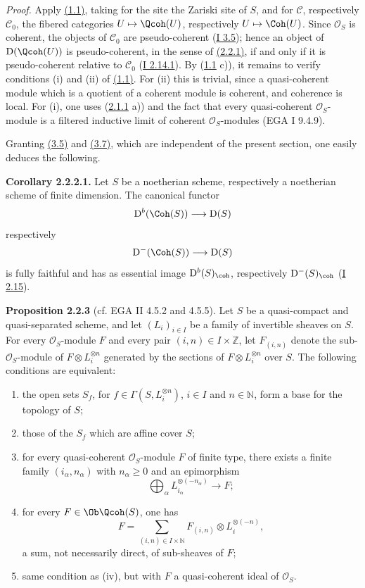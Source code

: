 \emph{Proof.} Apply \hyperlink{sga6.e02.prop.1-1}{(1.1)}, taking for the site the Zariski site of $S$, and for $\mathcal C$, respectively $\mathcal C_0$, the fibered categories $U\mapsto\Qcoh(U)$, respectively $U\mapsto\Coh(U)$. Since $\mathcal O_S$ is coherent, the objects of $\mathcal C_0$ are pseudo-coherent (\hyperlink{sga6.e01.cor.3-5}{I 3.5}); hence an object of $\mathrm D(\Qcoh(U))$ is pseudo-coherent, in the sense of \hyperlink{sga6.e02.notation.2-2-1}{(2.2.1)}, if and only if it is pseudo-coherent relative to $\mathcal C_0$ (\hyperlink{sga6.e01.schol.2-14-1}{I 2.14.1}). By (\hyperlink{sga6.e02.prop.1-1}{1.1} c)), it remains to verify conditions (i) and (ii) of \hyperlink{sga6.e02.prop.1-1}{(1.1)}. For (ii) this is trivial, since a quasi-coherent module which is a quotient of a coherent module is coherent, and coherence is local. For (i), one uses (\hyperlink{sga6.e02.lem.2-1-1}{2.1.1} a)) and the fact that every quasi-coherent $\mathcal O_S$-module is a filtered inductive limit of coherent $\mathcal O_S$-modules (EGA I 9.4.9).

Granting \hyperlink{sga6.e02.prop.3-5}{(3.5)} and \hyperlink{sga6.e02.prop.3-7}{(3.7)}, which are independent of the present section, one easily deduces the following.

\textbf{Corollary 2.2.2.1.} Let $S$ be a noetherian scheme, respectively a noetherian scheme of finite dimension. The canonical functor
\[
\mathrm D^b(\Coh(S))\longrightarrow \mathrm D(S)
\]
respectively
\[
\mathrm D^{-}(\Coh(S))\longrightarrow \mathrm D(S)
\]
is fully faithful and has as essential image $\mathrm D^b(S)_{\coh}$, respectively $\mathrm D^{-}(S)_{\coh}$ (\hyperlink{sga6.e01.ex.2-15}{I 2.15}).

\textbf{Proposition 2.2.3} (cf. EGA II 4.5.2 and 4.5.5). Let $S$ be a quasi-compact and quasi-separated scheme, and let $(L_i)_{i\in I}$ be a family of invertible sheaves on $S$. For every $\mathcal O_S$-module $F$ and every pair $(i,n)\in I\times\mathbb Z$, let $F_{(i,n)}$ denote the sub-$\mathcal O_S$-module of $F\otimes L_i^{\otimes n}$ generated by the sections of $F\otimes L_i^{\otimes n}$ over $S$. The following conditions are equivalent:
\begin{enumerate}[label=(\roman*)]
\item the open sets $S_f$, for $f\in\Gamma(S,L_i^{\otimes n})$, $i\in I$ and $n\in\mathbb N$, form a base for the topology of $S$;
\item those of the $S_f$ which are affine cover $S$;
\item for every quasi-coherent $\mathcal O_S$-module $F$ of finite type, there exists a finite family $(i_\alpha,n_\alpha)$ with $n_\alpha\ge0$ and an epimorphism
\[
\bigoplus_\alpha L_{i_\alpha}^{\otimes(-n_\alpha)}\longrightarrow F;
\]
\item for every $F\in\Ob\Qcoh(S)$, one has
\[
F=\sum_{(i,n)\in I\times\mathbb N}F_{(i,n)}\otimes L_i^{\otimes(-n)},
\]
a sum, not necessarily direct, of sub-sheaves of $F$;
\item same condition as (iv), but with $F$ a quasi-coherent ideal of $\mathcal O_S$.
\end{enumerate}


